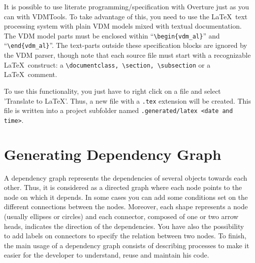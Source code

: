 \documentclass{overturerepchap}
\begin{document}

It is possible to use literate programming/specification \cite{Johnson96} with
Overture just as you can with VDMTools. To take advantage of this,
you need to use the \LaTeX\ text processing system with
plain VDM models mixed with textual documentation.  The VDM model parts must be
enclosed within ``\verb+\begin{vdm_al}+'' and ``\verb+\end{vdm_al}+''. The
text-parts outside these specification blocks are ignored by the VDM parser,
though note that each source file must start with a recognizable \LaTeX\
construct: a \verb+\documentclass, \section, \subsection+ or a \LaTeX\ comment.


To use this functionality, you just have to right click on a file and select 'Translate to LaTeX'. Thus, a new file with a \texttt{.tex} extension will be created. This file is written into a project subfolder named \texttt{.generated/latex <date and time>}.

\chapter{Generating Dependency Graph}\label{sec:dependencyGraph}

A dependency graph represents the dependencies of several objects towards each other. Thus, it is considered as a directed graph where each node points to the node on which it depends. In some cases you can add some conditions set on the different connections between the nodes. Moreover, each shape represents a node (usually ellipses or circles) and each connector, composed of one or two arrow heads, indicates the direction of the dependencies. You have also the possibility to add labels on connectors to specify the relation between two nodes. To finish, the main usage of a dependency graph consists of describing processes to make it easier for the developer to understand, reuse and maintain his code.
\end{document}
